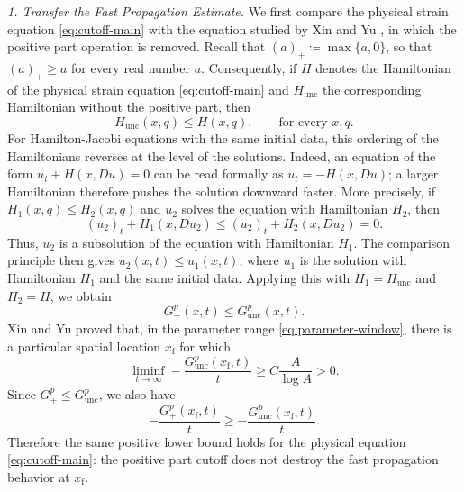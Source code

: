 \documentclass[11pt,reqno,noamsfonts]{amsart}
\theoremstyle{definition}
\theoremstyle{remark}
\begin{document}
\textit{1. Transfer the Fast Propagation Estimate.}
We first compare the physical strain equation \eqref{eq:cutoff-main} with the equation studied
by Xin and Yu \cite{XinYu2014}, in which the positive part operation is
removed. Recall that
  $(a)_+\coloneqq \max\{a,0\}$,
so that $(a)_+\ge a$ for every real number $a$. Consequently, if $H$ denotes the
Hamiltonian of the physical strain equation \eqref{eq:cutoff-main} and $H_{\mathrm{unc}}$ the
corresponding Hamiltonian without the positive part, then
\[
  H_{\mathrm{unc}}(x,q)\le H(x,q),
  \qquad\text{for every }x,q.
\]
For Hamilton-Jacobi equations with the same initial data, this ordering
of the Hamiltonians reverses at the level of the solutions. Indeed, an
equation of the form
  $u_t+H(x,Du)=0$
can be read formally as $u_t=-H(x,Du)$; a larger Hamiltonian therefore
pushes the solution downward faster. More precisely, if
$H_1(x,q)\le H_2(x,q)$ and $u_2$ solves the equation with Hamiltonian
$H_2$, then
\[
  (u_2)_t+H_1(x,Du_2)
  \le
  (u_2)_t+H_2(x,Du_2)
  =0.
\]
Thus, $u_2$ is a subsolution of the equation with Hamiltonian $H_1$.
The comparison principle then gives
  $u_2(x,t)\le u_1(x,t)$,
where $u_1$ is the solution with Hamiltonian $H_1$ and the same initial
data. Applying this with $H_1=H_{\mathrm{unc}}$ and $H_2=H$, we obtain
\[
  G_+^p(x,t)\le G_{\mathrm{unc}}^p(x,t).
\]
Xin and Yu proved that, in the parameter range
\eqref{eq:parameter-window}, there is a particular spatial location
$x_{\mathrm f}$ for which
\[
  \liminf_{t\to\infty}
  -\frac{G_{\mathrm{unc}}^p(x_{\mathrm f},t)}{t}
  \ge C\frac{A}{\log A}>0.
\]
Since $G_+^p\le G_{\mathrm{unc}}^p$, we also have
\[
  -\frac{G_+^p(x_{\mathrm f},t)}{t}
  \ge
  -\frac{G_{\mathrm{unc}}^p(x_{\mathrm f},t)}{t}.
\]
Therefore the same positive lower bound holds for the physical equation \eqref{eq:cutoff-main}:
the positive part cutoff does not destroy the fast propagation behavior
at $x_{\mathrm f}$.
\end{document}
